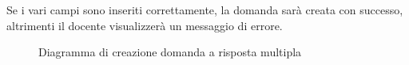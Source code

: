\documentclass[a4paper, titlepage]{article}
\begin{document}
Se i vari campi sono inseriti correttamente, la domanda sarà creata con successo, altrimenti il docente visualizzerà un messaggio di errore.

\newpage
{}
\begin{figure}[H]
	\centering
	\noindent{}
	\caption{Diagramma di creazione domanda a risposta multipla}
\end{figure}
\end{document}
